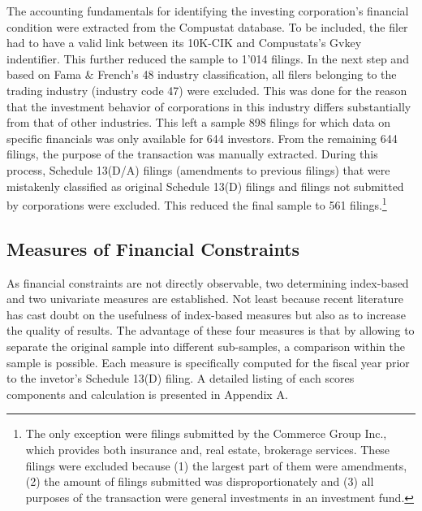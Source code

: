 \documentclass[12pt]{article}
\begin{document}
The accounting fundamentals for identifying the investing corporation's financial condition were extracted from the Compustat database. To be included, the filer had to have a valid link between its 10K-CIK and Compustats's Gvkey indentifier. This further reduced the sample to 1'014 filings. In the next step and based on Fama \& French's 48 industry classification, all filers belonging to the trading industry (industry code 47) were excluded. This was done for the reason that the investment behavior of corporations in this industry differs substantially from that of other industries. This left a sample 898 filings for which data on specific financials was only available for 644 investors. From the remaining 644 filings, the purpose of the transaction was manually extracted. During this process, Schedule 13(D/A) filings (amendments to previous filings) that were mistakenly classified as original Schedule 13(D) filings and filings not submitted by corporations were excluded. This reduced the final sample to 561 filings.\footnote{The only exception were filings submitted by the Commerce Group Inc., which provides both insurance and, real estate, brokerage services. These filings were excluded because (1) the largest part of them were amendments, (2) the amount of filings submitted was disproportionately and (3) all purposes of the transaction were general investments in an investment fund.} 

\subsection{Measures of Financial Constraints}

As financial constraints are not directly observable, two determining index-based and two univariate measures are established. Not least because recent literature has cast doubt on the usefulness \citep[p.109]{Khatami2014} of index-based measures but also as to increase the quality of results. The advantage of these four measures is that by allowing to separate the original sample into different sub-samples, a comparison within the sample is possible. Each measure is specifically computed for the fiscal year prior to the invetor's Schedule 13(D) filing. A detailed listing of each scores components and calculation is presented in Appendix A.\\
\end{document}

